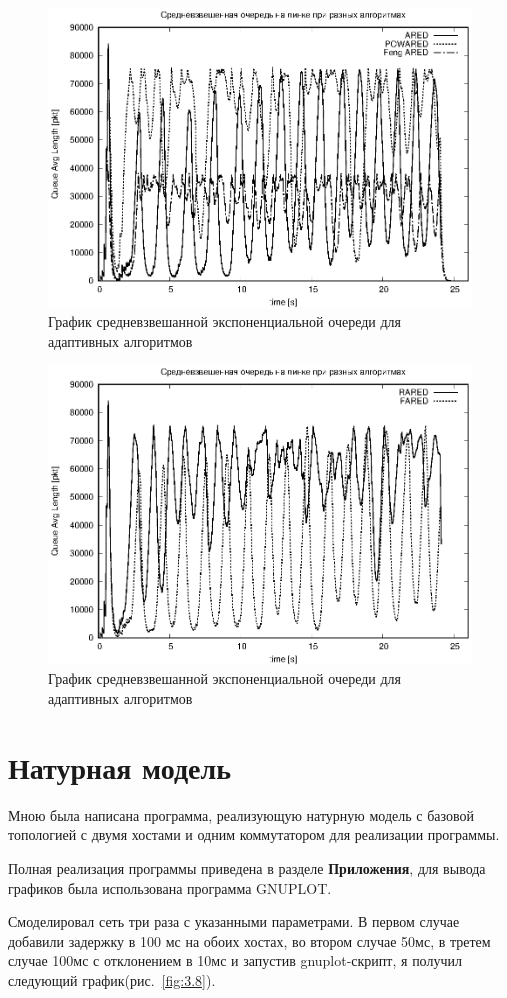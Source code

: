 \begin{figure}[!ht]
  \centering
  \includegraphics[width=0.7\linewidth]{image/av_queues_adaptive2.eps}
  \caption{График средневзвешанной экспоненциальной очереди для адаптивных алгоритмов}
  \label{fig:3.6}
\end{figure}

\begin{figure}[!ht]
  \centering
  \includegraphics[width=0.7\linewidth]{image/av_queues_adaptive3.eps}
  \caption{График средневзвешанной экспоненциальной очереди для адаптивных алгоритмов}
  \label{fig:3.7}
\end{figure}

\section{Натурная модель}

Мною была написана программа, реализующую натурную модель с 
базовой топологией с двумя хостами и одним коммутатором для реализации
программы.
 
Полная реализация программы приведена в разделе \textbf{Приложения},
для вывода графиков была использована программа GNUPLOT.

Смоделировал сеть три раза с указанными параметрами. В первом случае добавили задержку в 100 мс на обоих хостах, во втором случае 50мс, в третем случае 100мс с отклонением в 10мс и запустив gnuplot-скрипт, я получил следующий график(рис.~\ref{fig:3.8}).

